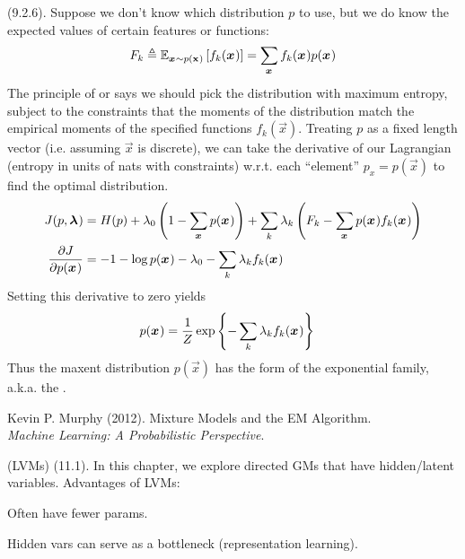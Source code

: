 \documentclass[11pt]{article}
\begin{document}
\myspace
\p {} (9.2.6). Suppose we don't know which distribution $p$ to use, but we do know the expected values of certain features or functions:
\begin{align}
	F_k \triangleq \E[\vec x \sim p(\rvec x)]{f_k(\vec x)} = \sum_{\vec x} f_k(\vec x) p(\vec x)
\end{align}
The principle of  or  says we should pick the distribution with maximum entropy, subject to the constraints that the moments of the distribution match the empirical moments of the specified functions $f_k(\vec x)$. Treating $p$ as a fixed length vector (i.e. assuming $\vec x$ is discrete), we can take the derivative of our Lagrangian (entropy in units of nats with constraints) w.r.t. each ``element'' $p_x = p(\vec x)$ to find the optimal distribution.
\begin{align}
	J(p, \vec\lambda)
		&= H(p) + \lambda_0 \left( 1 - \sum_{\vec x} p(\vec x) \right) + \sum_k \lambda_k \left(F_k - \sum_{\vec x} p(\vec x) f_k(\vec x) \right) \\
	\pderiv{J}{p(\vec x)}
		&= -1 - \log p(\vec x) - \lambda_0 - \sum_k \lambda_k f_k(\vec x)
\end{align}
Setting this derivative to zero yields
\begin{align}
	p(\vec x) 
		&= \inv{Z} \exp\left\{ -\sum_k \lambda_k f_k(\vec x)  \right\}
\end{align}
Thus the maxent distribution $p(\vec x)$ has the form of the exponential family, a.k.a. the . 












\vspace{-1.7em}
{\scriptsize Kevin P. Murphy (2012). Mixture Models and the EM Algorithm.\\ \textit{Machine Learning: A Probabilistic Perspective}.\\ }

\p {} (LVMs) (11.1). In this chapter, we explore directed GMs that have hidden/latent variables. Advantages of LVMs:
\begin{compactenum}
	\item Often have fewer params.
	\item Hidden vars can serve as a bottleneck (representation learning).
\end{compactenum}
\end{document}
